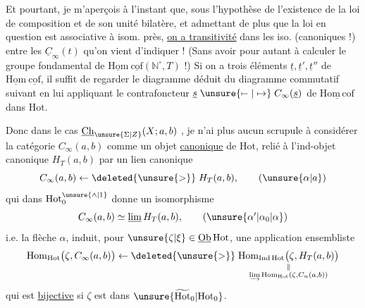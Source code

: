 Et pourtant, je m'aperçois à l'instant que, sous l'hypothèse de l'existence de la loi de composition et de son unité bilatère, et admettant de plus que la loi en question est associative à isom. près, \uline{on a transitivité} dans les iso. (canoniques !) entre les $\underline C_\infty(t)$ qu'on vient d'indiquer !
(Sans avoir pour autant à calculer le groupe fondamental de $\underline{\mathrm{Hom}}\ \underline{\mathrm{cof}}(\mathbb N^\circ,T)$ !) Si on a trois éléments $\underline t,\underline t',\underline t''$ de $\underline{\mathrm{Hom}}\ \underline{\mathrm{cof}}$, il suffit de regarder le diagramme déduit du diagramme commutatif suivant
en lui appliquant le contrafoncteur $\underline s\mathrel{\unsure{\mapstochar\relbar|\mapsto}}C_\infty(\underline s)$ de $\underline{\mathrm{Hom\,cof}}$ dans $\mathrm{Hot}$.

Donc dans le cas  $\underline{\mathrm{Ch}}_{\unsure{\Sigma|Z}}(X;a,b)$ , je n'ai plus aucun scrupule à considérer la catégorie $C_\infty(a,b)$ comme un objet \uline{canonique} de $\mathrm{Hot}$, relié à  l'ind-objet canonique $H_T(a,b)$  par un lien canonique
\[
C_\infty(a,b)\mathrel{\leftarrow\deleted{\unsure{>}}}H_T(a,b),
\tag*{$(\unsure{\alpha|a})$}
\]
qui dans $\mathrm{Hot}_0^{\unsure{\wedge|1}}$ donne un isomorphisme
\[
C_\infty(a,b)\simeq\underline{\lim}\,H_T(a,b),
\tag*{$(\unsure{\alpha'|\alpha_0|\alpha})$}
\]
i.e. la flèche $\alpha$, induit, pour $\unsure{\zeta|\xi}\in\underline{\mathrm{Ob}}\,\mathrm{Hot}$, une application ensembliste
\[
\mathrm{Hom}_{\mathrm{Hot}}\bigl(\zeta,C_\infty(a,b)\bigr)
\mathrel{\leftarrow\deleted{\unsure{>}}}
\underset{\substack{\Vert\\
\underrightarrow{\lim}\,\mathrm{Hom}_{\mathrm{Hot}}(\zeta,C_n(a,b))}}
{\mathrm{Hom}_{\mathrm{Ind\,Hot}}\bigl(\zeta,H_T(a,b)\bigr)}
\]
qui est \uline{bijective} si $\zeta$ est dans $\unsure{\widetilde{\mathrm{Hot}}_0|\mathrm{Hot}_0}$.

